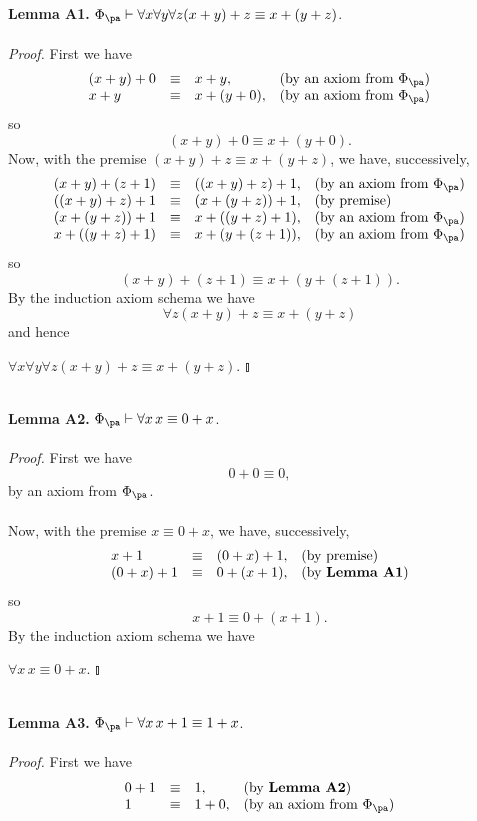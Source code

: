 \textbf{Lemma A1.} $\Phi_\pa \vdash \forall x \forall y \forall z (x + y) + z \equiv x + (y + z)$.\\
\ \\
\textit{Proof.} First we have
\[
\begin{array}{llll}
(x + y) + 0 & \equiv & x + y, & \mbox{(by an axiom from $\Phi_\pa$)} \cr
x + y & \equiv & x + (y + 0), & \mbox{(by an axiom from $\Phi_\pa$)}
\end{array}
\]
so
\[
(x + y) + 0 \equiv x + (y + 0).
\]
Now, with the premise $(x + y) + z \equiv x + (y + z)$, we have, successively,
\[
\begin{array}{llll}
(x + y) + (z + 1) & \equiv & ((x + y) + z) + 1, & \mbox{(by an axiom from $\Phi_\pa$)} \cr
((x + y) + z) + 1 & \equiv & (x + (y + z)) + 1, & \mbox{(by premise)} \cr
(x + (y + z)) + 1 & \equiv & x + ((y + z) + 1), & \mbox{(by an axiom from $\Phi_\pa$)} \cr
x + ((y + z) + 1) & \equiv & x + (y + (z + 1)), & \mbox{(by an axiom from $\Phi_\pa$)} 
\end{array}
\]
so
\[
(x + y) + (z + 1) \equiv x + (y + (z + 1)).
\]
By the induction axiom schema we have
\[
\forall z (x + y) + z \equiv x + (y + z)
\]
and hence
\begin{center}
\phantom{$\talloblong$} \hfill $\forall x \forall y \forall z (x + y) + z \equiv x + (y + z).$ \hfill $\talloblong$
\end{center}
\ \\
\textbf{Lemma A2.} $\Phi_\pa \vdash \forall x \, x \equiv 0 + x$.\\
\ \\
\textit{Proof.} First we have
\[
0 + 0 \equiv 0,
\]
by an axiom from $\Phi_\pa$.\\
\ \\
Now, with the premise $x \equiv 0 + x$, we have, successively,
\[
\begin{array}{llll}
x + 1 & \equiv & (0 + x) + 1, & \mbox{(by premise)} \cr
(0 + x) + 1 & \equiv & 0 + (x + 1), & \mbox{(by \textbf{Lemma A1})}
\end{array}
\]
so
\[
x + 1 \equiv 0 + (x + 1).
\]
By the induction axiom schema we have
\begin{center}
\phantom{$\talloblong$} \hfill $\forall x \, x \equiv 0 + x.$ \hfill $\talloblong$
\end{center}
\ \\
\textbf{Lemma A3.} $\Phi_\pa \vdash \forall x \, x + 1 \equiv 1 + x$.\\
\ \\
\textit{Proof.} First we have
\[
\begin{array}{llll}
0 + 1 & \equiv & 1, & \mbox{(by \textbf{Lemma A2})}\cr
1 & \equiv & 1 + 0, & \mbox{(by an axiom from $\Phi_\pa$)}
\end{array}
\]
